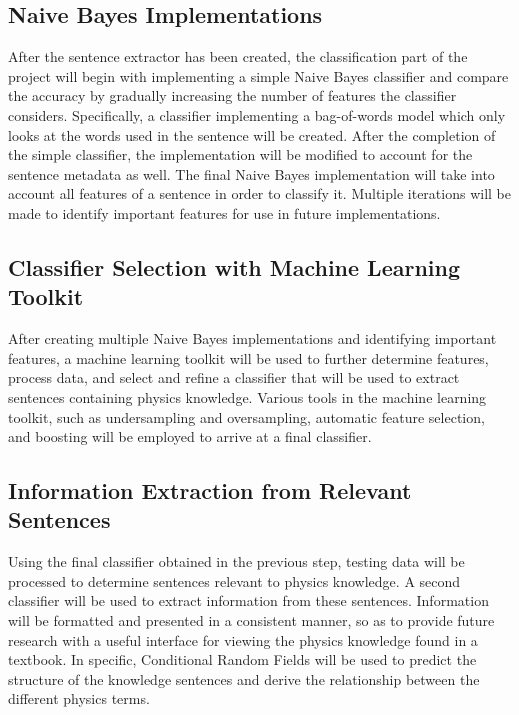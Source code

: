 \documentclass{article} %
\begin{document}
\subsection{Naive Bayes Implementations}

After the sentence extractor has been created, the classification part of the project will begin with implementing a simple Naive Bayes classifier and compare the accuracy by gradually increasing the number of features the classifier considers. Specifically, a classifier implementing a bag-of-words model which only looks at the words used in the sentence will be created. After the completion of the simple classifier, the implementation will be modified to account for the sentence metadata as well. The final Naive Bayes implementation will take into account all features of a sentence in order to classify it. Multiple iterations will be made to identify important features for use in future implementations.

\subsection{Classifier Selection with Machine Learning Toolkit}

After creating multiple Naive Bayes implementations and identifying important features, a machine learning toolkit will be used to further determine features, process data, and select and refine a classifier that will be used to extract sentences containing physics knowledge. Various tools in the machine learning toolkit, such as undersampling and oversampling, automatic feature selection, and boosting will be employed to arrive at a final classifier.

\subsection{Information Extraction from Relevant Sentences}

Using the final classifier obtained in the previous step, testing data will be processed to determine sentences relevant to physics knowledge. A second classifier will be used to extract information from these sentences. Information will be formatted and presented in a consistent manner, so as to provide future research with a useful interface for viewing the physics knowledge found in a textbook. In specific, Conditional Random Fields will be used to predict the structure of the knowledge sentences and derive the relationship between the different physics terms.
\end{document}
